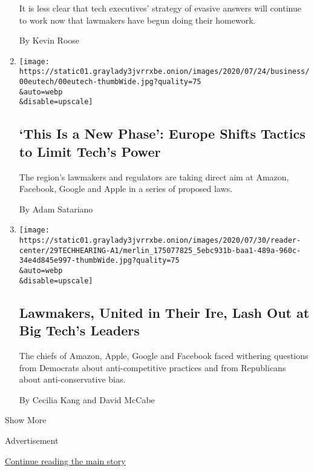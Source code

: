 \begin{enumerate}
  It is less clear that tech executives' strategy of evasive answers
  will continue to work now that lawmakers have begun doing their
  homework.

  By Kevin Roose
\item
  \href{/2020/07/30/technology/europe-new-phase-tech-amazon-apple-facebook-google.html}{}

  \texttt{[image: https://static01.graylady3jvrrxbe.onion/images/2020/07/24/business/00eutech/00eutech-thumbWide.jpg?quality=75\\\&auto=webp\\\&disable=upscale]}

  \hypertarget{this-is-a-new-phase-europe-shifts-tactics-to-limit-techs-power}{%
  \subsection{`This Is a New Phase': Europe Shifts Tactics to Limit
  Tech's
  Power}\label{this-is-a-new-phase-europe-shifts-tactics-to-limit-techs-power}}

  The region's lawmakers and regulators are taking direct aim at Amazon,
  Facebook, Google and Apple in a series of proposed laws.

  By Adam Satariano
\item
  \href{/2020/07/29/technology/big-tech-hearing-apple-amazon-facebook-google.html}{}

  \texttt{[image: https://static01.graylady3jvrrxbe.onion/images/2020/07/30/reader-center/29TECHHEARING-A1/merlin\_175077825\_5ebc931b-baa1-489a-960c-34e4d845e997-thumbWide.jpg?quality=75\\\&auto=webp\\\&disable=upscale]}

  \hypertarget{lawmakers-united-in-their-ire-lash-out-at-big-techs-leaders}{%
  \subsection{Lawmakers, United in Their Ire, Lash Out at Big Tech's
  Leaders}\label{lawmakers-united-in-their-ire-lash-out-at-big-techs-leaders}}

  The chiefs of Amazon, Apple, Google and Facebook faced withering
  questions from Democrats about anti-competitive practices and from
  Republicans about anti-conservative bias.

  By Cecilia Kang and David McCabe
\end{enumerate}

Show More

Advertisement

\protect\hyperlink{after-mid2}{Continue reading the main story}

